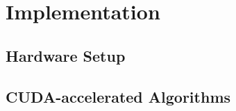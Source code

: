 \section{Implementation}
\label{sec:implementation}

\subsection{Hardware Setup}
\subsection{CUDA-accelerated Algorithms}